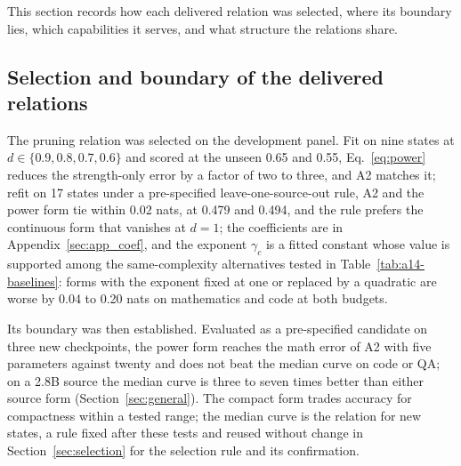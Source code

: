 This section records how each delivered relation was selected, where its boundary lies, which
capabilities it serves, and what structure the relations share.

\subsection{Selection and boundary of the delivered relations}
\label{sec:app_selbound}

The pruning relation was selected on the development panel. Fit on nine states at $d\in\{0.9,0.8,0.7,0.6\}$
and scored at the unseen 0.65 and 0.55, Eq.~\ref{eq:power} reduces the
strength-only error by a factor of two to three, and A2 matches it; refit on 17
states under a pre-specified leave-one-source-out rule, A2 and the power form tie within 0.02 nats, at 0.479 and 0.494, and the rule prefers the continuous form that vanishes at $d=1$; the coefficients are in Appendix~\ref{sec:app_coef}, and the exponent $\gamma_c$ is a fitted constant whose value is supported among the same-complexity alternatives tested in Table~\ref{tab:a14-baselines}: forms with the exponent fixed at one or replaced by a quadratic are worse by 0.04 to 0.20 nats on mathematics and code at both budgets.

Its boundary was then established. Evaluated as a pre-specified candidate on three new checkpoints, the power form reaches the math error of A2 with five parameters against twenty and does not beat the median curve on code or QA; on a 2.8B source the median curve is three to seven times better than either source form (Section~\ref{sec:general}). The compact form trades accuracy for compactness within a tested range; the median curve is the relation for new states, a rule fixed after these tests and reused without change in Section~\ref{sec:selection} for the selection rule and its confirmation.

